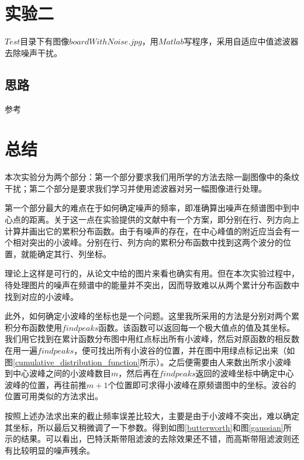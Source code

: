 \documentclass[UTF8]{ctexart}
\begin{document}
    
    \section{实验二}
            \indent $Test$目录下有图像$boardWithNoise.jpg$，用$Matlab$写程序，采用自适应中值滤波器去除噪声干扰。
            
        \subsection{思路}
            \indent 参考\cite{齐春亮2005自适应中值滤波器}
         
            
            


	\section{总结}
		\indent 本次实验分为两个部分：第一个部分要求我们用所学的方法去除一副图像中的条纹干扰；第二个部分是要求我们学习并使用滤波器对另一幅图像进行处理。
        
        \indent 第一个部分最大的难点在于如何确定噪声的频率，即准确算出噪声在频谱图中到中心点的距离。关于这一点在实验提供的文献中有一个方案，即分别在行、列方向上计算并画出它的累积分布函数。由于有噪声的存在，在中心峰值的附近应当会有一个相对突出的小波峰。分别在行、列方向的累积分布函数中找到这两个波分的位置，就能确定其行、列坐标。
        
        \indent 理论上这样是可行的，从论文中给的图片来看也确实有用。但在本次实验过程中，待处理图片的噪声在频谱中的能量并不突出，因而导致难以从两个累计分布函数中找到对应的小波峰。
        
        \indent 此外，如何确定小波峰的坐标也是一个问题。这里我所采用的方法是分别对两个累积分布函数使用$findpeaks$函数。该函数可以返回每一个极大值点的值及其坐标。我们用它找到在累计函数分布图中用红点标出所有小波峰，然后对原函数的相反数在用一遍$findpeaks$，便可找出所有小波谷的位置，并在图中用绿点标记出来（如图\ref{cumulative_distribution_function}所示）。之后便需要由人来数出所求小波峰到中心波峰之间的小波峰数目$m$，然后再在$findpeaks$返回的波峰坐标中确定中心波峰的位置，再往前推$m+1$个位置即可求得小波峰在原频谱图中的坐标。波谷的位置可用类似的方法求出。
        
        \indent 按照上述办法求出来的截止频率误差比较大，主要是由于小波峰不突出，难以确定其坐标，所以最后又稍微调了一下参数。得到如图\ref{butterworth}和图\ref{gaussian}所示的结果。可以看出，巴特沃斯带阻滤波的去除效果还不错，而高斯带阻滤波则还有比较明显的噪声残余。
		

		
	
	
%
%

\end{document}
